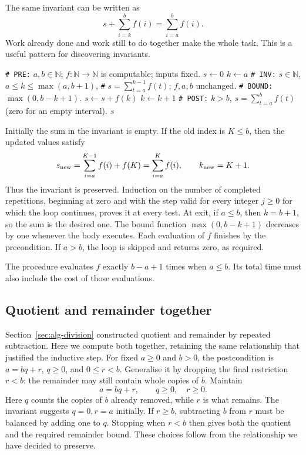The same invariant can be written as
\[
s+\sum_{i=k}^{b}f(i)=\sum_{i=a}^{b}f(i).
\]
Work already done and work still to do together make the whole task.
This is a useful pattern for discovering invariants.

\begin{algorithm}[H]
\begin{algorithmic}[1]
\Statex \texttt{\# PRE:} $a,b\in\mathbb N$; $f:\mathbb N\to\mathbb N$ is computable; inputs fixed.
\State $s\leftarrow0$
\State $k\leftarrow a$
\Statex \texttt{\# INV:} $s\in\mathbb N$, $a\leq k\leq\max(a,b+1)$,
\Statex \texttt{\#} $s=\sum_{t=a}^{k-1}f(t)$; $f,a,b$ unchanged.
\Statex \texttt{\# BOUND:} $\max(0,b-k+1)$.
\State $s\leftarrow s+f(k)$
\State $k\leftarrow k+1$
\EndWhile
\Statex \texttt{\# POST:} $k>b$, $s=\sum_{t=a}^{b}f(t)$ (zero for an empty interval).
\State \Return $s$
\EndProcedure
\end{algorithmic}
\caption{Accumulate the sum of successive function values.}
\end{algorithm}

Initially the sum in the invariant is empty. If the old index is $K\leq b$,
then the updated values satisfy
\[
s_{\rm new}=\sum_{i=a}^{K-1}f(i)+f(K)=\sum_{i=a}^{K}f(i),
\qquad k_{\rm new}=K+1.
\]
Thus the invariant is preserved. Induction on the number of completed
repetitions, beginning at zero and with the step valid for every integer
$j\geq0$ for which the loop continues, proves it at every test. At exit, if $a\leq b$, then $k=b+1$, so the sum is the desired one.
The bound function $\max(0,b-k+1)$ decreases by one whenever the body
executes. Each evaluation of $f$ finishes by the precondition. If $a>b$,
the loop is skipped and returns zero, as required.

The procedure evaluates $f$ exactly $b-a+1$ times when $a\leq b$.
Its total time must also include the cost of those evaluations.

\subsection{Quotient and remainder together}

Section~\ref{sec:alg-division} constructed quotient and remainder by
repeated subtraction. Here we compute both together, retaining the same
relationship that justified the inductive step. For fixed $a\geq0$ and
$b>0$, the postcondition is $a=bq+r$, $q\geq0$, and $0\leq r<b$.
Generalise it by dropping the final restriction $r<b$: the remainder may
still contain whole copies of $b$. Maintain
\[
a=bq+r,\qquad q\geq0,\quad r\geq0.
\]
Here $q$ counts the copies of $b$ already removed, while $r$ is what remains.
The invariant suggests $q=0,r=a$ initially. If $r\geq b$, subtracting
$b$ from $r$ must be balanced by adding one to $q$. Stopping when $r<b$
then gives both the quotient and the required remainder bound. These
choices follow from the relationship we have decided to preserve.

